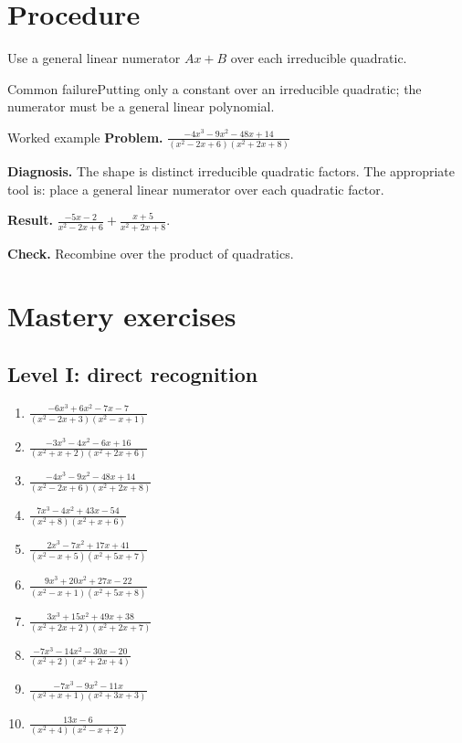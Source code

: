 \documentclass[11pt,oneside]{book}
\begin{document}
\section{Procedure}
Use a general linear numerator $Ax+B$ over each irreducible quadratic.

\begin{warningbox}{Common failure}Putting only a constant over an irreducible quadratic; the numerator must be a general linear polynomial.\end{warningbox}
\begin{examplebox}{Worked example}
\textbf{Problem.} $\displaystyle \frac{- 4 x^{3} - 9 x^{2} - 48 x + 14}{\left(x^{2} - 2 x + 6\right) \left(x^{2} + 2 x + 8\right)}$

\textbf{Diagnosis.} The shape is distinct irreducible quadratic factors. The appropriate tool is: place a general linear numerator over each quadratic factor.

\textbf{Result.} $\displaystyle \frac{- 5 x - 2}{x^{2} - 2 x + 6} + \frac{x + 5}{x^{2} + 2 x + 8}$.

\textbf{Check.} Recombine over the product of quadratics.
\end{examplebox}
\section{Mastery exercises}
\subsection*{Level I: direct recognition}
\begin{enumerate}[leftmargin=*,label=\textbf{\arabic*.},itemsep=0.65\baselineskip]
\item $\displaystyle \frac{- 6 x^{3} + 6 x^{2} - 7 x - 7}{\left(x^{2} - 2 x + 3\right) \left(x^{2} - x + 1\right)}$
\item $\displaystyle \frac{- 3 x^{3} - 4 x^{2} - 6 x + 16}{\left(x^{2} + x + 2\right) \left(x^{2} + 2 x + 6\right)}$
\item $\displaystyle \frac{- 4 x^{3} - 9 x^{2} - 48 x + 14}{\left(x^{2} - 2 x + 6\right) \left(x^{2} + 2 x + 8\right)}$
\item $\displaystyle \frac{7 x^{3} - 4 x^{2} + 43 x - 54}{\left(x^{2} + 8\right) \left(x^{2} + x + 6\right)}$
\item $\displaystyle \frac{2 x^{3} - 7 x^{2} + 17 x + 41}{\left(x^{2} - x + 5\right) \left(x^{2} + 5 x + 7\right)}$
\item $\displaystyle \frac{9 x^{3} + 20 x^{2} + 27 x - 22}{\left(x^{2} - x + 1\right) \left(x^{2} + 5 x + 8\right)}$
\item $\displaystyle \frac{3 x^{3} + 15 x^{2} + 49 x + 38}{\left(x^{2} + 2 x + 2\right) \left(x^{2} + 2 x + 7\right)}$
\item $\displaystyle \frac{- 7 x^{3} - 14 x^{2} - 30 x - 20}{\left(x^{2} + 2\right) \left(x^{2} + 2 x + 4\right)}$
\item $\displaystyle \frac{- 7 x^{3} - 9 x^{2} - 11 x}{\left(x^{2} + x + 1\right) \left(x^{2} + 3 x + 3\right)}$
\item $\displaystyle \frac{13 x - 6}{\left(x^{2} + 4\right) \left(x^{2} - x + 2\right)}$
\end{enumerate}
\end{document}
